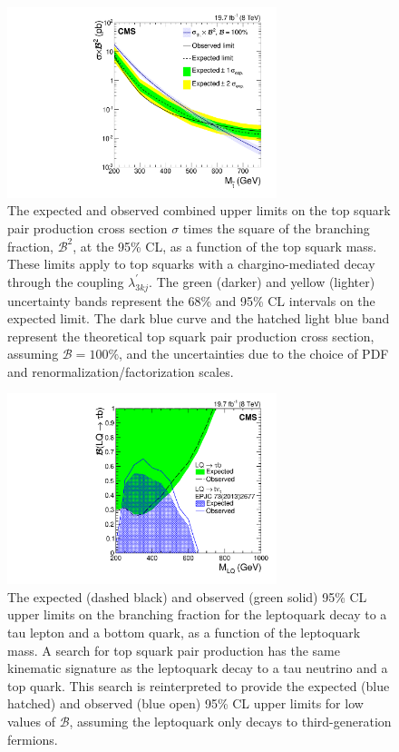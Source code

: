\documentclass[12pt]{thesis}  %
\begin{document}
\begin{figure}[htbp]
\centering
    \includegraphics[width=0.7\textwidth]{figures/final/BR_Sigma_TauTau_LQD.pdf}
    \caption{The expected and observed combined upper limits on the top squark pair production cross section $\sigma$ times the square of the branching fraction, $\mathcal{B}^2$, at the 95\% CL, as a function of the top squark mass. These limits apply to top squarks with a chargino-mediated decay through the coupling $\lambda^{\prime}_{3kj}$. The green (darker) and yellow (lighter) uncertainty bands represent the 68\% and 95\% CL intervals on the expected limit. The dark blue curve and the hatched light blue band represent the theoretical top squark pair production cross section, assuming $\mathcal{B}=100\%$, and the uncertainties due to the choice of PDF and renormalization/factorization scales.}
    \label{Res:fig:asymptoticCombLQD}
\end{figure}

\begin{figure}[htbp]
\centering
    \includegraphics[width=0.7\textwidth]{figures/final/limit_beta_vs_mass_btau_topnu.pdf}
    \caption{The expected (dashed black) and observed (green solid) 95\% CL upper limits on the branching fraction for the leptoquark decay to a tau lepton and a bottom quark, as a function of the leptoquark mass. A search for top squark pair production \cite{SUS-13-011} has the same kinematic signature as the leptoquark decay to a tau neutrino and a top quark. This search is reinterpreted to provide the expected (blue hatched) and observed (blue open) 95\% CL upper limits for low values of $\mathcal{B}$, assuming the leptoquark only decays to third-generation fermions.}
    \label{Res:fig:2DCombLQ}
\end{figure}
\end{document}
